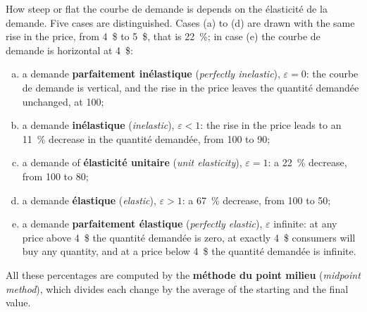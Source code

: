 How steep or flat the courbe de demande is depends on the élasticité de la
demande. Five cases are distinguished. Cases (a) to (d) are drawn with the same rise
in the price, from 4~\$ to 5~\$, that is 22~\%; in case (e) the courbe de demande
is horizontal at 4~\$:
\begin{enumerate}[(a)]
  \item a demande \textbf{parfaitement inélastique} (\textit{perfectly inelastic}),
    $\varepsilon = 0$: the courbe de demande is vertical, and the rise in the price
    leaves the quantité demandée unchanged, at 100;
  \item a demande \textbf{inélastique} (\textit{inelastic}), $\varepsilon < 1$: the
    rise in the price leads to an 11~\% decrease in the quantité demandée, from 100
    to 90;
  \item a demande of \textbf{élasticité unitaire} (\textit{unit elasticity}),
    $\varepsilon = 1$: a 22~\% decrease, from 100 to 80;
  \item a demande \textbf{élastique} (\textit{elastic}), $\varepsilon > 1$: a 67~\%
    decrease, from 100 to 50;
  \item a demande \textbf{parfaitement élastique} (\textit{perfectly elastic}),
    $\varepsilon$ infinite: at any price above 4~\$ the quantité demandée is zero,
    at exactly 4~\$ consumers will buy any quantity, and at a price below 4~\$ the
    quantité demandée is infinite.
\end{enumerate}
All these percentages are computed by the \textbf{méthode du point milieu}
(\textit{midpoint method}), which divides each change by the average of the
starting and the final value.


